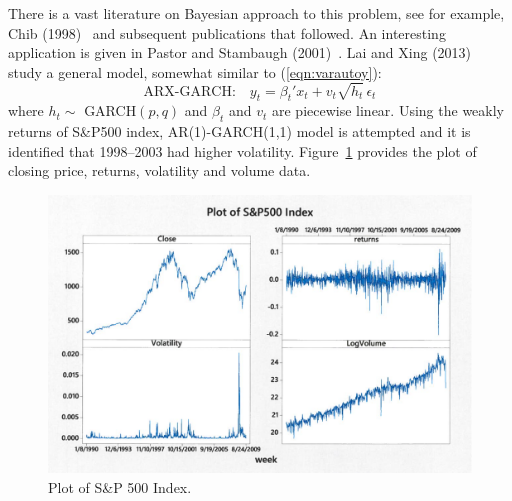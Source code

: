 There is a vast literature on Bayesian approach to this problem, see for example, Chib (1998)~\cite{chib} and subsequent publications that followed. An interesting application is given in Pastor and Stambaugh (2001)~\cite{pastor}. Lai and Xing (2013)~\cite{laixing} study a general model, somewhat similar to (\ref{eqn:varautoy}):
	\begin{equation}\label{eqn:arxgarch}
	\text{ARX-GARCH:} \quad y_t= \beta_t' x_t + v_t \sqrt{h_t} \, \epsilon_t
	\end{equation}
where $h_t\sim$ GARCH$(p,q)$ and $\beta_t$ and $v_t$ are piecewise linear. Using the weakly returns of S\&P500 index, AR(1)-GARCH(1,1) model is attempted and it is identified that 1998--2003 had higher volatility. Figure~\ref{fig:sp500} provides the plot of closing price, returns, volatility and volume data. 


	\begin{figure}[!ht]
	\centering
	\includegraphics[width=\textwidth]{chapters/chapter_uvts/figures/sp500.png}
	\caption{Plot of S\&P 500 Index. \label{fig:sp500}}
	\end{figure}



